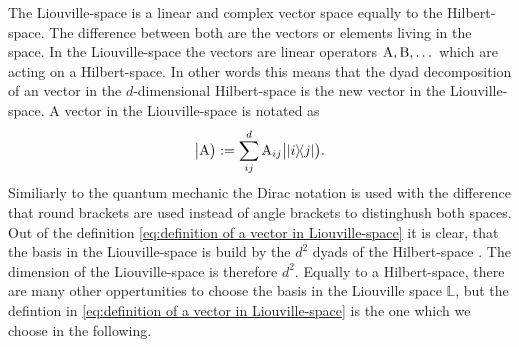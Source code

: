 The Liouville-space is a linear and complex vector space equally to the Hilbert-space.
The difference between both are the vectors or elements living in the space.
In the Liouville-space the vectors are linear operators $\mathrm{A}, \mathrm{B}, \dots$ which are acting on a Hilbert-space.
In other words this means that the dyad decomposition of an vector in the $d$-dimensional Hilbert-space is the new vector in the Liouville-space.
A vector in the Liouville-space is notated as
%
\begin{align}
	\oket{\mt{A}} := \sum\limits_{ij}^{d} \mt{A}_{ij} \oket{\dyad{i}{j}}.
	\label{eq:definition of a vector in Liouville-space}
\end{align}
%
Similiarly to the quantum mechanic the Dirac notation is used with the difference that round brackets are used instead of angle brackets to distinghush both spaces.
Out of the definition \eqref{eq:definition of a vector in Liouville-space} it is clear, that the basis in the Liouville-space is build by the $d^{2}$ dyads of the Hilbert-space .
The dimension of the Liouville-space is therefore $d^{2}$.
Equally to a Hilbert-space, there are many other oppertunities to choose the basis in the Liouville space $\mathbb{L}$, but the defintion in \eqref{eq:definition of a vector in Liouville-space} is the one which we choose in the following.


